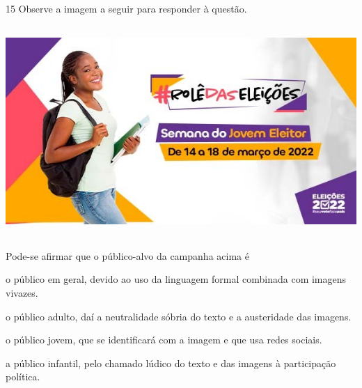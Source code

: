 \num{15} Observe a imagem a seguir para responder à questão.

\includegraphics[width=5.90551in,height=3.15278in]{./imgSAEB_7_POR/media/image20.png}


Pode-se afirmar que o público-alvo da campanha acima é

\begin{escolha}

    \item o público em geral, devido ao uso da linguagem formal combinada com imagens vivazes.
    
    \item o público adulto, daí a neutralidade sóbria do texto e a austeridade das imagens. 
    
    \item o público jovem, que se identificará com a imagem e que usa redes sociais.  
    
    \item a público infantil, pelo chamado lúdico do texto e das imagens à participação política. 

\end{escolha}





